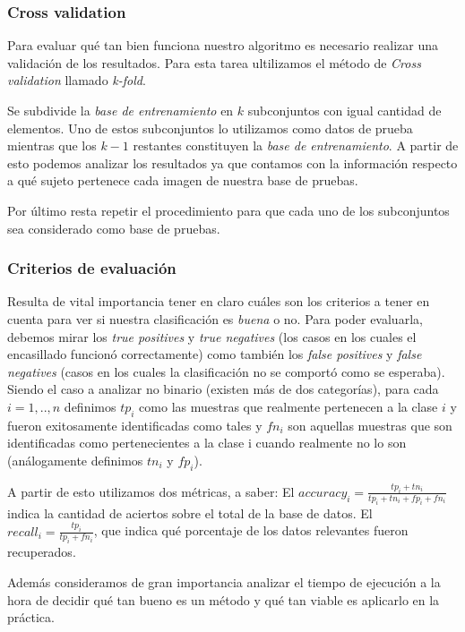 \subsubsection*{Cross validation} 
\par Para evaluar qu\'e tan bien funciona nuestro algoritmo es necesario realizar una validaci\'on de los resultados. Para esta tarea ultilizamos el m\'etodo de \textit{Cross validation} llamado \textit{k-fold}. \par Se subdivide la \textit{base de entrenamiento} en $k$ subconjuntos con igual cantidad
de elementos. Uno de estos subconjuntos lo utilizamos como datos de prueba mientras que los $k-1$ restantes constituyen la \textit{base de entrenamiento}. A partir de esto
podemos analizar los resultados ya que contamos con la informaci\'on respecto a qu\'e sujeto pertenece cada imagen de nuestra base de pruebas.
\par Por \'ultimo resta repetir
el procedimiento para que cada uno de los subconjuntos sea considerado como base de pruebas.

\subsubsection*{Criterios de evaluaci\'on}
Resulta de vital importancia tener en claro cu\'ales son los criterios a tener en cuenta para ver si nuestra clasificaci\'on es \textit{buena} o no.
Para poder evaluarla, debemos mirar los \textit{true positives} y \textit{true negatives} (los casos en los cuales el encasillado funcion\'o correctamente)
como tambi\'en los \textit{false positives} y \textit{false negatives} (casos en los cuales la clasificaci\'on no se comport\'o como se esperaba).\\
Siendo el caso a analizar no binario (existen m\'as de dos categor\'ias), para cada $i = 1,..,n$  definimos $tp_i$ como
las muestras que realmente pertenecen a la clase $i$ y fueron exitosamente identificadas como tales
y $fn_i$ son aquellas muestras que son identificadas como pertenecientes a la clase i cuando realmente no lo son (an\'alogamente definimos $tn_i$ y $fp_i$).
\par A partir de esto utilizamos dos m\'etricas, a saber:
El $accuracy_i = \frac{tp_i+tn_i}{tp_i + tn_i + fp_i + fn_i}$ indica la cantidad de aciertos sobre el total de la base de datos.
El $recall_i= \frac{tp_i}{tp_i + fn_i}$, que indica qu\'e porcentaje de los datos relevantes fueron recuperados.
\par Además consideramos de gran importancia analizar el tiempo de ejecución a la hora de decidir qu\'e tan bueno es un m\'etodo y qu\'e tan viable es 
aplicarlo en la pr\'actica.


